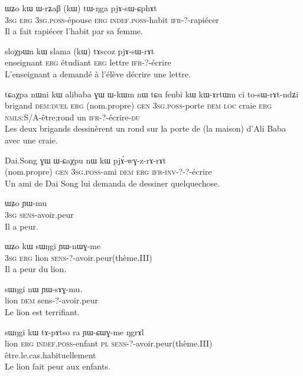 \documentclass[oldfontcommands,twoside,a4paper,12pt]{article}
\begin{document}
\begin{exe}
\ex 
\gll ɯʑo kɯ ɯ-rʑaβ (kɯ) tɯ-ŋga pjɤ-sɯ-ɕphɤt \\
\textsc{3sg} \textsc{erg} \textsc{3sg.poss}-épouse  \textsc{erg} \textsc{indef.poss}-habit \textsc{ifr}-?-rapiécer \\
\glt Il a fait rapiécer l'habit par sa femme.
\end{exe} 

\begin{exe}
\ex sloχpɯn kɯ slama (kɯ) tɤscoz pjɤ-sɯ-rɤt \\
enseignant \textsc{erg} étudiant \textsc{erg} lettre \textsc{ifr}-?-écrire \\
\glt L'enseignant a demandé à l'élève décrire une lettre.
\end{exe}

\begin{exe}
\ex
\gll 
tɕaχpa nɯni kɯ alibaba ɣɯ ɯ-kɯm nɯ tɕu fenbi kɯ kɯ-ɤrtɯm ci to-sɯ-rɤt-ndʑi \\
brigand \textsc{dem:duel} \textsc{erg} (nom.propre) \textsc{gen} \textsc{3sg.poss}-porte \textsc{dem} \textsc{loc} craie \textsc{erg} \textsc{nmls}:S/A-être;rond un \textsc{ifr}-?-écrire-\textsc{du} \\
\glt Les deux brigands dessinèrent un rond sur la porte de (la maison) d'Ali Baba avec une craie.
\end{exe}

\begin{exe}
\ex 
\gll Dai.Song ɣɯ ɯ-ɕaχpu nɯ kɯ pjɤ́-wɣ-z-rɤ-rɤt \\
(nom.propre) \textsc{gen} \textsc{3sg.poss}-ami \textsc{dem} \textsc{erg}  \textsc{ifr}-\textsc{inv}-?-?-écrire \\
\glt Un ami de Dai Song lui demanda de dessiner quelquechose.
\end{exe} 

\begin{exe}
\ex 
\gll ɯʑo ɲɯ-mu \\
\textsc{3sg} \textsc{sens}-avoir.peur \\
\glt Il a peur.
\end{exe}

\begin{exe}
\ex 
\gll ɯʑo kɯ sɯŋgi ɲɯ-nɯɣ-me \\
\textsc{3sg} \textsc{erg} lion  \textsc{sens}-?-avoir.peur(thème.III) \\
\glt Il a peur du lion.
\end{exe}

\begin{exe}
\ex 
\gll sɯŋgi nɯ ɲɯ-sɤɣ-mu. \\
lion \textsc{dem} sens-?-avoir.peur \\
\glt Le lion est terrifiant.
\end{exe}

\begin{exe}
\ex 
\gll  sɯŋgi kɯ tɤ-pɤtso ra ɲɯ-ɕɯɣ-me ŋgrɤl \\
lion \textsc{erg} \textsc{indef.poss}-enfant \textsc{pl} \textsc{sens}-?-avoir.peur(thème.III) être.le.cas.habituellement \\
\glt Le lion fait peur aux enfants.
\end{exe}
\end{document}
